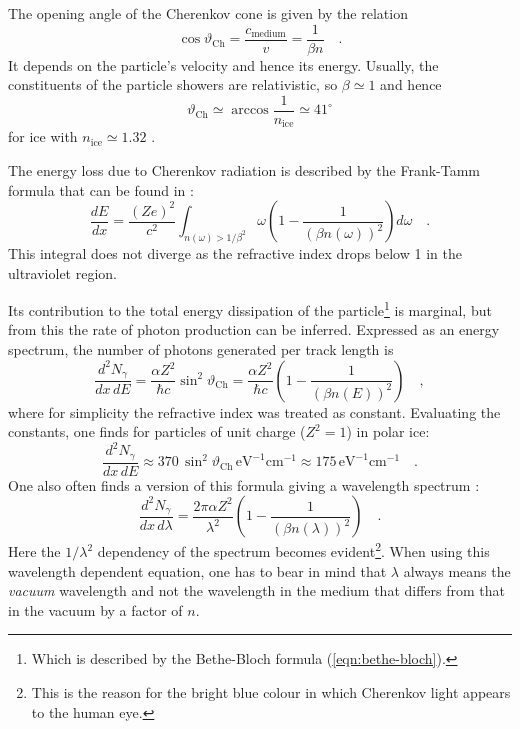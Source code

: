 The opening angle of the Cherenkov cone is given by the relation
\begin{equation}
  \cos \vartheta_{\mathrm{Ch}} = 
      \frac{c_{\mathrm{medium}}}{v} = \frac{1}{\beta n} \quad.
\end{equation}
It depends on the particle's velocity and hence its energy. Usually, the 
constituents of the particle showers are relativistic, so $\beta \simeq 1$ and 
hence 
\begin{equation}
  \vartheta_{\mathrm{Ch}} \simeq \arccos \frac{1}{n_{\mathrm{ice}}} 
      \simeq \mathrm{41^{\circ}}
  \label{eqn:ChkovAngle}
\end{equation}
for ice with $n_{\mathrm{ice}} \simeq 1.32$ \cite{PriceWoschnagg}.

The energy loss due to Cherenkov radiation is described by the Frank-Tamm 
formula that can be found in \cite{Jackson}:
\begin{equation}
  \frac{dE}{dx} = \frac{(Z e)^2}{c^2} \int_{n(\omega)>1/\beta^2} \omega 
    \left( 1 - \frac{1}{(\beta n(\omega))^2} \right) d\omega \quad.
\end{equation}
This integral does not diverge as the refractive index drops below 1 in the 
ultraviolet region.

Its contribution to the total energy dissipation of the particle\footnote{Which 
is described by the Bethe-Bloch formula (\ref{eqn:bethe-bloch}).} is marginal, 
but from this the rate of photon production can be inferred. Expressed as an 
energy spectrum, the number of photons generated per track length is
\cite{PDG}
\begin{equation}
  \frac{d^2 N_{\gamma}}{dx\,dE} 
    = \frac{\alpha Z^2}{\hbar c} \sin^2 \vartheta_{\mathrm{Ch}}
    = \frac{\alpha Z^2}{\hbar c} \left(1-\frac{1}{(\beta n(E))^2}\right) \quad,
\end{equation}
where for simplicity the refractive index was treated as constant. Evaluating 
the constants, one finds for particles of unit charge ($Z^2 = 1$) in polar ice:
\begin{equation}
  \frac{d^2 N_{\gamma}}{dx\,dE} 
    \approx 370\,\sin^2\vartheta_{\mathrm{Ch}}\,\mathrm{eV}^{-1}\mathrm{cm}^{-1}
    \approx 175 \,\mathrm{eV}^{-1}\mathrm{cm}^{-1} \quad.
\end{equation}
One also often finds a version of this formula giving a wavelength spectrum 
\cite{PDG}:
\begin{equation}
  \frac{d^2 N_{\gamma}}{dx\,d\lambda} = \frac{2\pi\alpha Z^2}{\lambda^2}
    \left(1-\frac{1}{(\beta n(\lambda))^2}\right) \quad.
  \label{eqn:FrankTammWvl}
\end{equation}
Here the $1/\lambda^2$ dependency of the spectrum becomes evident\footnote{This 
is the reason for the bright blue colour in which Cherenkov light appears to 
the human eye.}. When using this wavelength dependent equation, one has to bear 
in mind that $\lambda$ always means the \emph{vacuum} wavelength and not the 
wavelength in the medium that differs from that in the vacuum by a factor of 
$n$.

